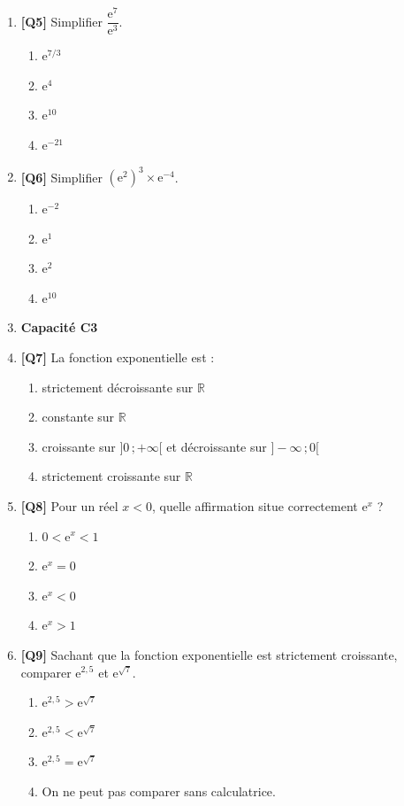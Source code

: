 \begin{enumerate}
\item \textbf{[Q5]} Simplifier $\dfrac{\mathrm{e}^{7}}{\mathrm{e}^{3}}$.
  \begin{enumerate}[label=\Alph*.]
    \item $\mathrm{e}^{7/3}$
    \item $\mathrm{e}^{4}$
    \item $\mathrm{e}^{10}$
    \item $\mathrm{e}^{-21}$
  \end{enumerate}

\item \textbf{[Q6]} Simplifier $(\mathrm{e}^{2})^3 \times \mathrm{e}^{-4}$.
  \begin{enumerate}[label=\Alph*.]
    \item $\mathrm{e}^{-2}$
    \item $\mathrm{e}^{1}$
    \item $\mathrm{e}^{2}$
    \item $\mathrm{e}^{10}$
  \end{enumerate}

\item[] \textbf{Capacité C3}

\item \textbf{[Q7]} La fonction exponentielle est :
  \begin{enumerate}[label=\Alph*.]
    \item strictement décroissante sur $\mathbb{R}$
    \item constante sur $\mathbb{R}$
    \item croissante sur $]0\,;+\infty[$ et décroissante sur $]-\infty\,;0[$
    \item strictement croissante sur $\mathbb{R}$
  \end{enumerate}

\item \textbf{[Q8]} Pour un réel $x<0$, quelle affirmation situe correctement $\mathrm{e}^x$ ?
  \begin{enumerate}[label=\Alph*.]
    \item $0<\mathrm{e}^x<1$
    \item $\mathrm{e}^x=0$
    \item $\mathrm{e}^x<0$
    \item $\mathrm{e}^x>1$
  \end{enumerate}

\item \textbf{[Q9]} Sachant que la fonction exponentielle est strictement croissante, comparer $\mathrm{e}^{2{,}5}$ et $\mathrm{e}^{\sqrt{7}}$.
  \begin{enumerate}[label=\Alph*.]
    \item $\mathrm{e}^{2{,}5} > \mathrm{e}^{\sqrt{7}}$
    \item $\mathrm{e}^{2{,}5} < \mathrm{e}^{\sqrt{7}}$
    \item $\mathrm{e}^{2{,}5} = \mathrm{e}^{\sqrt{7}}$
    \item On ne peut pas comparer sans calculatrice.
  \end{enumerate}


\end{enumerate}
